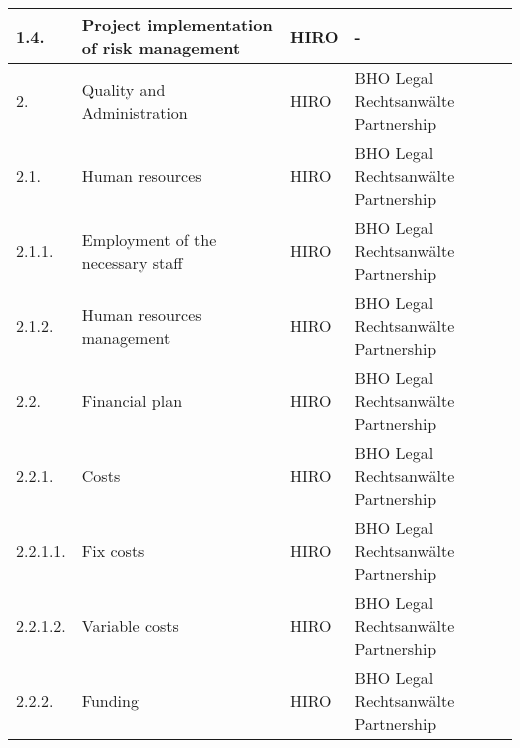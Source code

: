 \begin{longtable}[H]{p{1.5cm} >{\raggedright\arraybackslash}p{4cm} >{\raggedright\arraybackslash}p{3.8cm} >{\raggedright\arraybackslash}p{4cm}}
	1.4. & Project implementation of risk management & HIRO & -\vspace{0.2cm} \\
	
	\midrule
	
	2. & Quality and Administration & HIRO & BHO Legal Rechtsanwälte Partnership\vspace{0.2cm} \\
	
	\midrule
	
	2.1. & Human resources & HIRO & BHO Legal Rechtsanwälte Partnership\vspace{0.2cm} \\
	
	\midrule
	
	2.1.1. & Employment of the necessary staff & HIRO & BHO Legal Rechtsanwälte Partnership\vspace{0.2cm} \\
	
	\midrule
	
	2.1.2. & Human resources management & HIRO & BHO Legal Rechtsanwälte Partnership\vspace{0.2cm} \\
	
	\midrule
	
	2.2. & Financial plan & HIRO & BHO Legal Rechtsanwälte Partnership\vspace{0.2cm} \\
	
	\midrule
	
	2.2.1. & Costs & HIRO & BHO Legal Rechtsanwälte Partnership\vspace{0.2cm} \\
	
	\midrule
	
	2.2.1.1. & Fix costs & HIRO & BHO Legal Rechtsanwälte Partnership\vspace{0.2cm} \\
	
	\midrule
	
	2.2.1.2. & Variable costs & HIRO & BHO Legal Rechtsanwälte Partnership\vspace{0.2cm} \\
	
	\midrule
	
	2.2.2. & Funding & HIRO & BHO Legal Rechtsanwälte Partnership\vspace{0.2cm} \\
	
	\midrule
	

\end{longtable}
